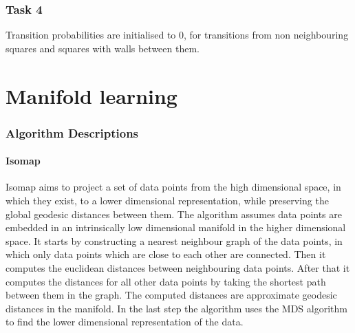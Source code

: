 \documentclass[a4paper, 11pt]{article}
\begin{document}
\section{Task 4}
Transition probabilities are initialised to 0, for transitions from non neighbouring squares and squares with walls between them.


\pagebreak
\part*{Manifold learning}
\section{Algorithm Descriptions}

\subsection{Isomap}
Isomap \cite{Tenenbaum2000} aims to project a set of data points from the high dimensional space, in which they exist, to a lower dimensional representation, while preserving the global geodesic distances between them. The algorithm assumes data points are embedded in an intrinsically low dimensional manifold in the higher dimensional space. It starts by constructing a nearest neighbour graph of the data points, in which only data points which are close to each other are connected. Then it computes the euclidean distances between neighbouring data points. After that it computes the distances for all other data points by taking the shortest path between them in the graph. The computed distances are approximate geodesic distances in the manifold. In the last step the algorithm uses the MDS algorithm to find the lower dimensional representation of the data.

%
\end{document}
